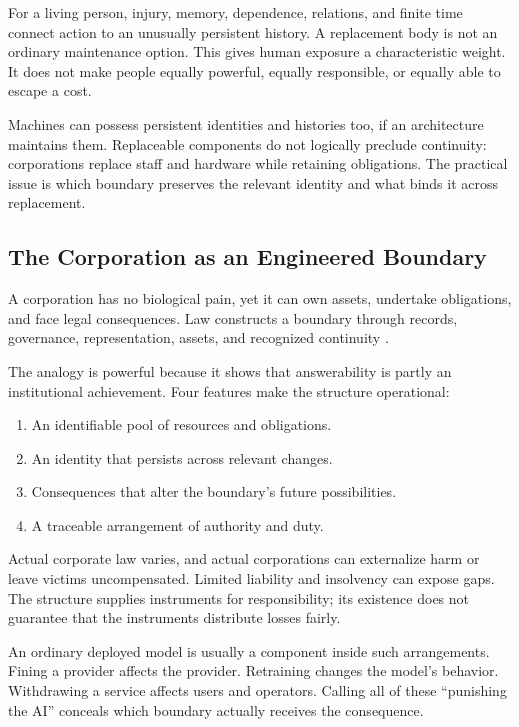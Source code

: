 \documentclass[11pt,openany]{book}
\begin{document}
For a living person, injury, memory, dependence, relations, and finite time connect action to an unusually persistent history. A replacement body is not an ordinary maintenance option. This gives human exposure a characteristic weight. It does not make people equally powerful, equally responsible, or equally able to escape a cost.

Machines can possess persistent identities and histories too, if an architecture maintains them. Replaceable components do not logically preclude continuity: corporations replace staff and hardware while retaining obligations. The practical issue is which boundary preserves the relevant identity and what binds it across replacement.

\subsection{The Corporation as an Engineered Boundary}

A corporation has no biological pain, yet it can own assets, undertake obligations, and face legal consequences. Law constructs a boundary through records, governance, representation, assets, and recognized continuity \cite{dewey1926historic}.

The analogy is powerful because it shows that answerability is partly an institutional achievement. Four features make the structure operational:
\begin{enumerate}
 \item An identifiable pool of resources and obligations.
 \item An identity that persists across relevant changes.
 \item Consequences that alter the boundary's future possibilities.
 \item A traceable arrangement of authority and duty.
\end{enumerate}

Actual corporate law varies, and actual corporations can externalize harm or leave victims uncompensated. Limited liability and insolvency can expose gaps. The structure supplies instruments for responsibility; its existence does not guarantee that the instruments distribute losses fairly.

An ordinary deployed model is usually a component inside such arrangements. Fining a provider affects the provider. Retraining changes the model's behavior. Withdrawing a service affects users and operators. Calling all of these “punishing the AI” conceals which boundary actually receives the consequence.
\end{document}
